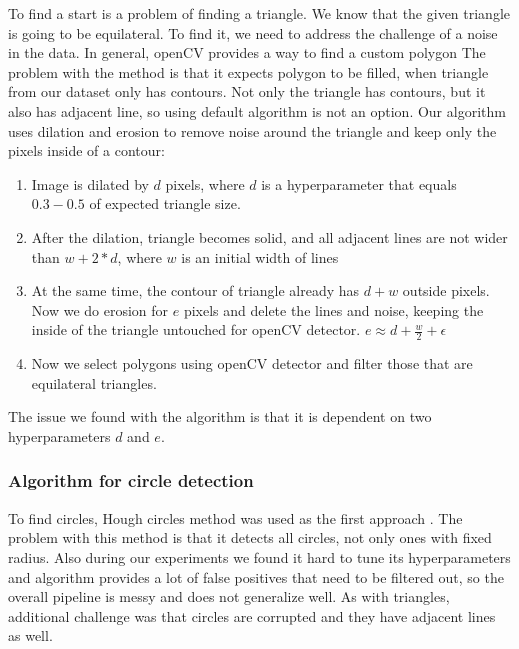 \documentclass[a4paper,12pt]{extarticle}
\begin{document}
To find a start is a problem of finding a triangle.
We know that the given triangle is going to be equilateral.
To find it, we need to address the challenge of a noise in the data.
In general, openCV provides a way to find a custom polygon \cite{contours}
The problem with the method is that it expects polygon to be filled, when triangle from our dataset only has contours.
Not only the triangle has contours, but it also has adjacent line, so using default algorithm is not an option.
Our algorithm uses dilation and erosion to remove noise around the triangle and keep only the pixels inside of a contour:
\begin{enumerate}
    \item Image is dilated by $d$ pixels, where $d$ is a hyperparameter that equals $0.3-0.5$ of expected triangle size.
    \item After the dilation, triangle becomes solid, and all adjacent lines are not wider than $w + 2 * d$, where $w$ is an initial width of lines
    \item At the same time, the contour of triangle already has $d + w$ outside pixels. Now we do erosion for $e$ pixels and delete the lines and noise, keeping the inside of the triangle untouched for openCV detector. $e \approx d + \frac{w}{2} + \epsilon$
    \item Now we select polygons using openCV detector and filter those that are equilateral triangles.
\end{enumerate}

The issue we found with the algorithm is that it is dependent on two hyperparameters $d$ and $e$.

\subsubsection{Algorithm for circle detection}

To find circles, Hough circles method was used as the first approach \cite{houghcircles}.
The problem with this method is that it detects all circles, not only ones with fixed radius.
Also during our experiments we found it hard to tune its hyperparameters and algorithm provides a lot of false positives that need to be filtered out, so the overall pipeline is messy and does not generalize well.
As with triangles, additional challenge was that circles are corrupted and they have adjacent lines as well.
\end{document}
